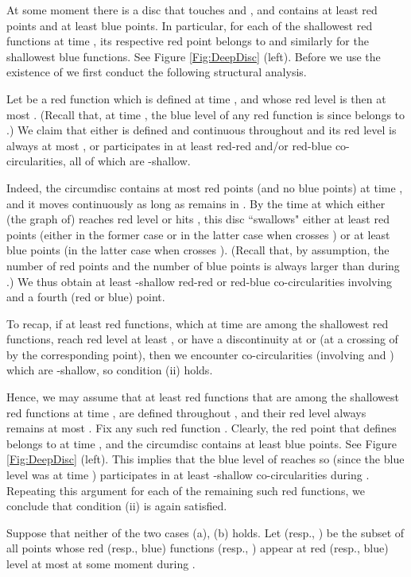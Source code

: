 \documentclass[letter,11pt]{article}
\begin{document}
\smallskip
{} At some moment  there is a disc  that touches  and , and contains at least  red points and at least  blue points.
In particular, for each of the  shallowest red functions  at time , its respective red point  belongs to  and similarly for the  shallowest blue functions.
See Figure \ref{Fig:DeepDisc} (left). Before we use the existence of  we first conduct the following structural analysis.

Let  be a red function which is defined at time , and whose red level is then at most . (Recall that, at time , the blue level of any red function is  since  belongs to .) We claim that either  is defined and continuous throughout  and its red level is always at most , or  participates in at least  red-red and/or red-blue co-circularities, all of which are -shallow. 

Indeed, the circumdisc  contains at most  red points (and no blue points) at time , and it moves continuously as long as  remains in . By the time at which either (the graph of)  reaches red level  or  hits , this disc ``swallows" either at least  red points (either in the former case or in the latter case when  crosses ) or at least  blue points (in the latter case when  crosses ). (Recall that, by assumption, the number of red points and the number of blue points is always larger than  during .) We thus obtain at least  -shallow red-red or red-blue co-circularities involving  and a fourth (red or blue) point. 

To recap, if at least  red functions, which at time  are among the  shallowest red functions, reach red level at least , or have a discontinuity at  or  (at a crossing of  by the corresponding point), then we encounter  co-circularities (involving  and ) which are -shallow, so condition (ii) holds.

Hence, we may assume that at least  red functions  that are among the  shallowest red functions at time , are defined throughout , and their red level always remains at most .
Fix any such red function .
Clearly, the red point  that defines  belongs to  at time , and the circumdisc  contains at least  blue points. See Figure \ref{Fig:DeepDisc} (left).
This implies that the blue level of  reaches  so (since the blue level was  at time )  participates in at least  -shallow co-circularities during . Repeating this argument for each of the remaining  such red functions, we conclude that condition (ii) is again satisfied.

\smallskip
{} Suppose that neither of the two cases (a), (b) holds. 
Let  (resp., ) be the subset of all points  whose red (resp., blue) functions  (resp., ) appear at red (resp., blue) level at most  at some moment during . 
\end{document}
